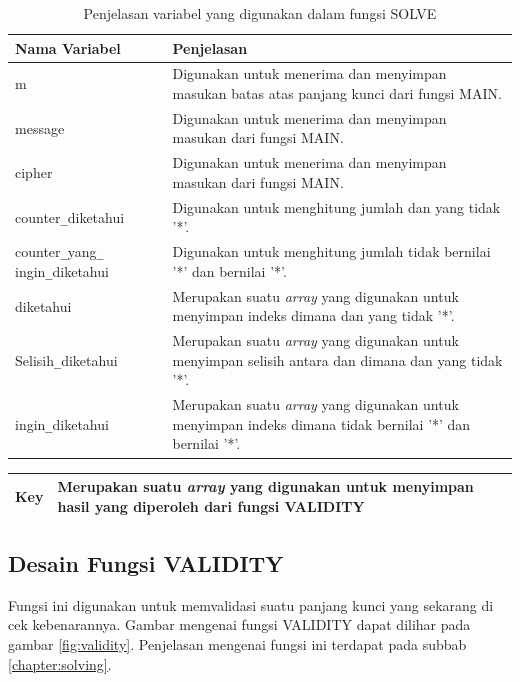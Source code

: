 	\begin{table}[H]
	 	\caption{Penjelasan variabel yang digunakan dalam fungsi SOLVE}
		\begin{tabular}   {|p{3cm}|p{6cm}|}\hline
		Nama Variabel&Penjelasan \\ \hline
		m&Digunakan untuk menerima dan menyimpan masukan batas atas panjang kunci dari fungsi MAIN. \\ \hline
		message&Digunakan untuk menerima dan menyimpan masukan \plaintext dari fungsi MAIN.\\ \hline
		cipher&Digunakan untuk menerima dan menyimpan masukan \ciphertext dari fungsi MAIN. \\ \hline
		counter\verb|_|diketahui&Digunakan untuk menghitung jumlah \plaintext dan \ciphertext yang tidak '*'. \\ \hline
		counter\verb|_|yang\verb|_| ingin\verb|_|diketahui&Digunakan untuk menghitung jumlah \ciphertext tidak bernilai '*' dan \plaintext bernilai '*'. \\ \hline
		diketahui&Merupakan suatu \textit{array} yang digunakan untuk menyimpan indeks dimana \plaintext dan \ciphertext yang tidak '*'. \\ \hline
		Selisih\verb|_|diketahui&Merupakan suatu \textit{array} yang digunakan untuk menyimpan selisih antara \plaintext dan \ciphertext dimana \plaintext dan \ciphertext yang tidak '*'. \\ \hline
		ingin\verb|_|diketahui&Merupakan suatu \textit{array} yang digunakan untuk menyimpan indeks dimana  \ciphertext tidak bernilai '*' dan \plaintext bernilai '*'. \\ \hline
		\end{tabular}%
		\label{tab:solvar}
	\end{table}
  	\begin{table}[H]
	 	
		\begin{tabular}   {|p{3cm}|p{6cm}|}\hline
		
		
		Key&Merupakan suatu \textit{array} yang digunakan untuk menyimpan hasil yang diperoleh dari fungsi VALIDITY \\ \hline
		\end{tabular}%
		\label{tab:solvar}
	\end{table}	
	
	
	\subsection{Desain Fungsi VALIDITY}
	Fungsi ini digunakan untuk memvalidasi suatu panjang kunci yang sekarang di cek kebenarannya. Gambar mengenai fungsi VALIDITY dapat dilihar pada gambar \ref{fig:validity}. Penjelasan mengenai fungsi ini terdapat pada subbab \ref{chapter:solving}. %
	
